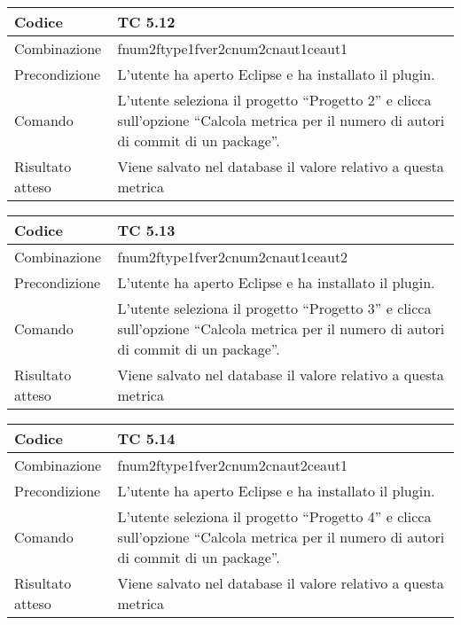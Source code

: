 \begin{table}[ht]
\begin{tabular}{|p{3cm}|p{9cm}|}
\hline
\cellcolor{lightgray}Codice				& TC 5.12								\\
\hline
\cellcolor{lightgray}Combinazione		& fnum2ftype1fver2cnum2cnaut1ceaut1 									\\
\hline
\cellcolor{lightgray}Precondizione		& L'utente ha aperto Eclipse e ha installato il plugin.				\\
\hline
\cellcolor{lightgray}Comando			& L'utente seleziona il progetto ``Progetto 2''  e clicca sull'opzione ``Calcola metrica per il numero di autori di commit di un package''.	\\
\hline
\cellcolor{lightgray}Risultato atteso	& Viene salvato nel database il valore relativo a questa metrica	\\
\hline
\end{tabular}
\end{table}

\begin{table}[ht]
\begin{tabular}{|p{3cm}|p{9cm}|}
\hline
\cellcolor{lightgray}Codice				& TC 5.13								\\
\hline
\cellcolor{lightgray}Combinazione		& fnum2ftype1fver2cnum2cnaut1ceaut2									\\
\hline
\cellcolor{lightgray}Precondizione		& L'utente ha aperto Eclipse e ha installato il plugin.					\\
\hline
\cellcolor{lightgray}Comando			& L'utente seleziona il progetto ``Progetto 3''  e clicca sull'opzione ``Calcola metrica per il numero di autori di commit di un package''.	\\
\hline
\cellcolor{lightgray}Risultato atteso	& Viene salvato nel database il valore relativo a questa metrica	\\
\hline
\end{tabular}
\end{table}

\begin{table}[ht]
\begin{tabular}{|p{3cm}|p{9cm}|}
\hline
\cellcolor{lightgray}Codice				& TC 5.14								\\
\hline
\cellcolor{lightgray}Combinazione		& fnum2ftype1fver2cnum2cnaut2ceaut1								\\
\hline
\cellcolor{lightgray}Precondizione		& L'utente ha aperto Eclipse e ha installato il plugin.			\\
\hline
\cellcolor{lightgray}Comando			& L'utente seleziona il progetto ``Progetto 4''  e clicca sull'opzione ``Calcola metrica per il numero di autori di commit di un package''.	\\
\hline
\cellcolor{lightgray}Risultato atteso	& Viene salvato nel database il valore relativo a questa metrica	\\
\hline
\end{tabular}
\end{table}


